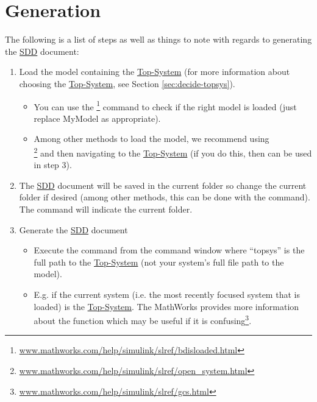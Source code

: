 \documentclass{mcscert}
\newcommand{\mathworks}{The MathWorks}
\newcommand{\topsystemnolink}{Top-System} %
\newcommand{\topsystem}{\hyperref[def:topsystem]{\topsystemnolink{}}}
\begin{document}
\section{Generation}
\label{sec:generation}
The following is a list of steps as well as things to note with regards to generating the \hyperref[acr:sdd]{SDD} document:

\begin{enumerate}
  \item Load the model containing the \topsystem{} (for more information about choosing the \topsystem{}, see Section \hyperref[sec:decide-topsys]{\ref*{sec:decide-topsys}}).
		\begin{itemize}
			\item You can use the \footnote{\href{https://www.mathworks.com/help/simulink/slref/bdisloaded.html}{www.mathworks.com/help/simulink/slref/bdisloaded.html}} command to check if the right model is loaded (just replace MyModel as appropriate).
			\item Among other methods to load the model, we recommend using\\ \footnote{\href{https://www.mathworks.com/help/simulink/slref/open_system.html}{www.mathworks.com/help/simulink/slref/open\_system.html}} and then navigating to the \topsystem{} (if you do this, then  can be used in step 3).
		\end{itemize}
		\item The \hyperref[acr:sdd]{SDD} document will be saved in the current \matlab{} folder so change the current folder if desired (among other methods, this can be done with the  command). 
		The  command will indicate the current folder.
  	\item Generate the \hyperref[acr:sdd]{SDD} document \label{itm:call-gen-sdd}
	\begin{itemize}
		\item Execute the  command from the \matlab{} command window where ``topsys'' is the full \simulink{} path to the \topsystem{} (not your system's full file path to the model).
		\item E.g.  if the current system (i.e. the most recently focused system that is loaded) is the \topsystem{}. 
		\mathworks{} provides more information about the  function which may be useful if it is confusing\footnote{\href{https://www.mathworks.com/help/simulink/slref/gcs.html}{www.mathworks.com/help/simulink/slref/gcs.html}}.

\end{itemize}
\end{enumerate}
\end{document}
